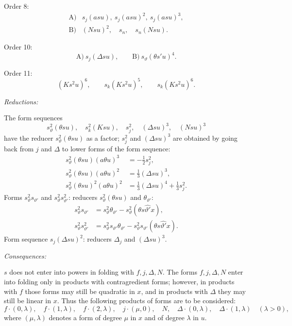 \documentclass[11pt]{article}
\newcommand{\A}{\Delta}
\begin{document}
\noindent Order 8:
\[
\begin{array}{ll}
\text{A)}&s_j(asu),\ s_j(asu)^2,\ s_j(asu)^3,\\[0.4em]
\text{B)}&(Nsu)^2,\quad s_n,\quad s_n(Nsu).
\end{array}
\]

\noindent Order 10:
\[
\text{A)}\ s_j(\A su),\qquad \text{B)}\ s_\vartheta(\theta s'u)^4.
\]

\noindent Order 11:
\[
(Ks^2u)^6,\qquad s_k(Ks^2u)^5,
\qquad s_k(Ks^2u)^6.
\]

\noindent\emph{Reductions:}

The form sequences
\[
 s_\vartheta^2(\theta su),\quad s_k^2(Ksu),\quad s_j^2,\quad (\A su)^3,
 \quad (Nsu)^3
\]
have the reducer $s_\vartheta^2(\theta su)$ as a factor; $s_j^2$ and $(\A su)^3$ are obtained by going back from $j$ and $\A$ to lower forms of the form sequence:
\[
\begin{aligned}
s_\vartheta^2(\theta su)(a\theta u)^3&=-\frac12s_j^2,\\
s_\vartheta^2(\theta su)(a\theta u)^2&=\frac13(\A su)^3,\\
s_\vartheta^2(\theta su)^2(a\theta u)^2&=\frac13(\A su)^4+\frac13s_j^2.
\end{aligned}
\]
Forms $s_\vartheta^2s_{\vartheta'}$ and $s_\vartheta^2s_{\vartheta'}^2$: reducers $s_\vartheta^2(\theta su)$ and $\theta_{\vartheta'}$:
\[
\begin{aligned}
s_\vartheta^2s_{\vartheta'}&=s_\vartheta^2\theta_{\vartheta'}-s_\vartheta^2(\theta s\widehat{\vartheta'}x),\\
s_\vartheta^2s_{\vartheta'}^2&=s_\vartheta^2s_{\vartheta'}\theta_{\vartheta'}-s_\vartheta^2s_{\vartheta'}(\theta s\widehat{\vartheta'}x).
\end{aligned}
\]
Form sequence $s_j(\A su)^2$: reducers $\A_j$ and $(\A su)^3$.

\noindent\emph{Consequences:}

$s$ does not enter into powers in folding with $f,j,\A,N$. The forms $f,j,\A,N$ enter into folding only in products with contragredient forms; however, in products with $f$ those forms may still be quadratic in $x$, and in products with $\A$ they may still be linear in $x$. Thus the following products of forms are to be considered:
\[
 f\cdot(0,\lambda),\quad f\cdot(1,\lambda),\quad f\cdot(2,\lambda),\quad
 j\cdot(\mu,0),\quad N,\quad
 \A\cdot(0,\lambda),\quad \A\cdot(1,\lambda)\quad(\lambda>0),
\]
where $(\mu,\lambda)$ denotes a form of degree $\mu$ in $x$ and of degree $\lambda$ in $u$.
\end{document}
